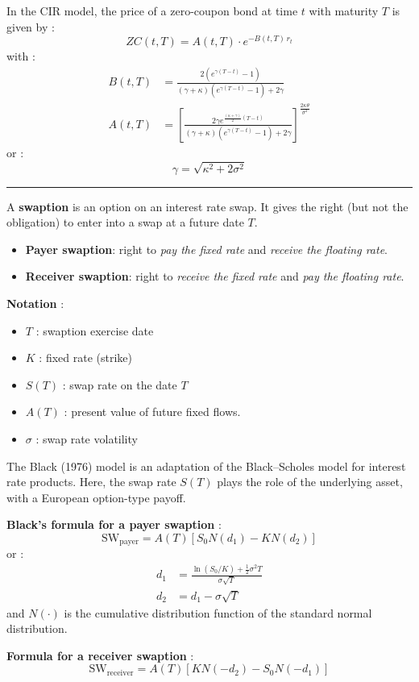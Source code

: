 \begin{f}
In the CIR model, the price of a zero-coupon bond at time \(t\) with maturity \(T\) is given by :
\[
ZC(t, T) = A(t, T) \cdot e^{-B(t, T)\, r_t}
\]
with :
\[
\begin{aligned}
	B(t, T) &= \frac{2 (e^{\gamma (T - t)} - 1)}{(\gamma + \kappa)(e^{\gamma (T - t)} - 1) + 2\gamma} \\
	A(t, T) &= \left[ \frac{2\gamma e^{\frac{(\kappa + \gamma)}{2}(T - t)}}{(\gamma + \kappa)(e^{\gamma (T - t)} - 1) + 2\gamma} \right]^{\frac{2\kappa\theta}{\sigma^2}}
\end{aligned}
\]
or :
\[
\gamma = \sqrt{\kappa^2 + 2\sigma^2}
\]

\end{f}
\hrule

\begin{f}

A \textbf{swaption} is an option on an interest rate swap. It gives the right (but not the obligation) to enter into a swap at a future date \(T\).

\begin{itemize}[nosep]
	\item \textbf{Payer swaption}: right to \emph{pay the fixed rate} and \emph{receive the floating rate}.
	\item \textbf{Receiver swaption}: right to \emph{receive the fixed rate} and \emph{pay the floating rate}.
\end{itemize}

\textbf{Notation} :
\begin{itemize}[nosep]
	\item \(T\) : swaption exercise date
	\item \(K\) : fixed rate (strike)
	\item \(S(T)\) : swap rate on the date \(T\)
	\item \(A(T)\) : present value of future fixed flows.
	\item \(\sigma\) : swap rate volatility
\end{itemize}

The Black (1976) model is an adaptation of the Black–Scholes model for interest rate products. Here, the swap rate \(S(T)\) plays the role of the underlying asset, with a European option-type payoff.

\textbf{Black's formula for a payer swaption} :
\[
\text{SW}_{\text{payer}} = A(T) \left[ S_0 N(d_1) - K N(d_2) \right]
\]
or :
\[
\begin{aligned}
	d_1 &= \frac{\ln(S_0 / K) + \frac{1}{2} \sigma^2 T}{\sigma \sqrt{T}} \\
	d_2 &= d_1 - \sigma \sqrt{T}
\end{aligned}
\]
and \(N(\cdot)\) is the cumulative distribution function of the standard normal distribution.

\textbf{Formula for a receiver swaption} :
\[
\text{SW}_{\text{receiver}} = A(T) \left[ K N(-d_2) - S_0 N(-d_1) \right]
\]

\end{f}

